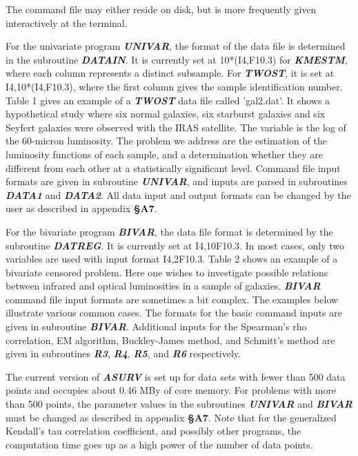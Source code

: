      The command file may either reside on disk, but is more frequently
given interactively at the terminal.

     For the univariate program {\sl\bf UNIVAR}, the format of the data file 
is determined in the subroutine {\sl\bf DATAIN}.  It is currently set 
at 10*(I4,F10.3) for {\sl\bf KMESTM}, where each column represents a 
distinct subsample.  For {\sl\bf TWOST}, it is set at I4,10*(I4,F10.3), 
where the first column gives the sample identification number. Table 1 
gives an example of a {\sl\bf TWOST} data file called 'gal2.dat'. It 
shows a hypothetical study where six normal galaxies, six starburst galaxies 
and six Seyfert galaxies were observed with the IRAS satellite. The variable 
is the log of the 60-micron luminosity.  The problem we address are the
estimation of the luminosity functions of each sample, and a determination 
whether they are different from each other at a statistically significant 
level.  Command file input formats are given in subroutine {\sl\bf UNIVAR}, 
and inputs are parsed in subroutines {\sl\bf DATA1} and {\sl\bf DATA2}.  All 
data input and output formats can be changed by the user as described in 
appendix {\bf \S A7}.

     For the bivariate program {\sl\bf BIVAR}, the data file format is 
determined by the subroutine {\sl\bf DATREG}.  It is currently set 
at I4,10F10.3.  In most cases, only two variables are used with input 
format I4,2F10.3.  Table 2 shows an example of a bivariate censored problem. 
 Here one wishes to investigate possible relations between infrared and 
optical luminosities in a sample of galaxies. {\sl\bf BIVAR} command file 
input formats are sometimes a bit complex. The examples below illustrate 
various common cases.  The formats for the basic command inputs are given in 
subroutine {\sl\bf BIVAR}.  Additional inputs for the Spearman's rho 
correlation, EM algorithm, Buckley-James method, and Schmitt's method are 
given in subroutines {\sl\bf R3}, {\sl\bf R4}, {\sl\bf R5}, and {\sl\bf R6} 
respectively.
 
     The current version of {\sl\bf ASURV} is set up for data sets with 
fewer than 500 data points and occupies about 0.46 MBy of core memory. 
For problems with more than 500 points, the parameter values in the 
subroutines {\sl\bf UNIVAR} and {\sl\bf BIVAR} must be changed as described 
in appendix {\bf\S A7}.  Note that for  the generalized Kendall's tau 
correlation coefficient, and possibly other programs,  the computation time 
goes up as a high power of the number of data points. 

